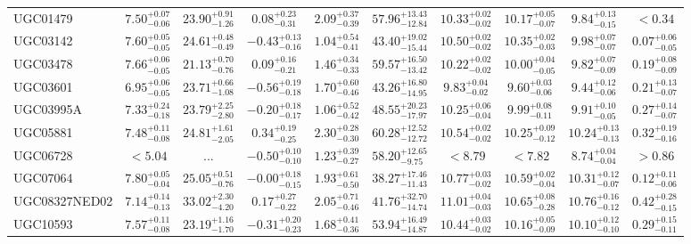 \documentclass[onecolumn]{mn2e}
\begin{document}
\begin{landscape}
{\begin{center}
\begin{longtable}{lccccccccc}
UGC01479 & $7.50_{-0.06}^{+0.07}$ & $23.90_{-1.26}^{+0.91}$ & $0.08_{-0.31}^{+0.23}$ & $2.09_{-0.39}^{+0.37}$ &$57.96_{-12.84}^{+13.43}$ & $10.33_{-0.02}^{+0.02}$ & $10.17_{-0.07}^{+0.05}$ & $9.84_{-0.15}^{+0.13}$ & $<0.34$ \\
UGC03142 & $7.60_{-0.05}^{+0.05}$ & $24.61_{-0.49}^{+0.48}$ & $-0.43_{-0.16}^{+0.13}$ & $1.04_{-0.41}^{+0.54}$ &$43.40_{-15.44}^{+19.02}$ & $10.50_{-0.02}^{+0.02}$ & $10.35_{-0.03}^{+0.02}$ & $9.98_{-0.07}^{+0.07}$ & $0.07_{-0.05}^{+0.06}$ \\
UGC03478 & $7.66_{-0.05}^{+0.06}$ & $21.13_{-0.76}^{+0.70}$ & $0.09_{-0.21}^{+0.16}$ & $1.46_{-0.33}^{+0.34}$ &$59.57_{-13.42}^{+16.50}$ & $10.22_{-0.02}^{+0.02}$ & $10.00_{-0.05}^{+0.04}$ & $9.82_{-0.09}^{+0.07}$ & $0.19_{-0.09}^{+0.08}$ \\
UGC03601 & $6.95_{-0.05}^{+0.06}$ & $23.71_{-1.08}^{+0.66}$ & $-0.56_{-0.18}^{+0.19}$ & $1.70_{-0.46}^{+0.60}$ &$43.26_{-14.95}^{+16.80}$ & $9.83_{-0.02}^{+0.04}$ & $9.60_{-0.06}^{+0.03}$ & $9.44_{-0.06}^{+0.12}$ & $0.21_{-0.07}^{+0.13}$ \\
UGC03995A & $7.33_{-0.18}^{+0.24}$ & $23.79_{-2.80}^{+2.25}$ & $-0.20_{-0.17}^{+0.18}$ & $1.06_{-0.42}^{+0.52}$ &$48.55_{-17.97}^{+20.23}$ & $10.25_{-0.04}^{+0.06}$ & $9.99_{-0.11}^{+0.08}$ & $9.91_{-0.05}^{+0.10}$ & $0.27_{-0.07}^{+0.14}$ \\
UGC05881 & $7.48_{-0.08}^{+0.11}$ & $24.81_{-2.05}^{+1.61}$ & $0.34_{-0.25}^{+0.19}$ & $2.30_{-0.30}^{+0.28}$ &$60.28_{-12.72}^{+12.52}$ & $10.54_{-0.02}^{+0.02}$ & $10.25_{-0.12}^{+0.09}$ & $10.24_{-0.13}^{+0.13}$ & $0.32_{-0.16}^{+0.19}$ \\
UGC06728 & $<5.04$ & ... & $-0.50_{-0.10}^{+0.10}$ & $1.23_{-0.27}^{+0.39}$ &$58.20_{-9.75}^{+12.65}$ & $<8.79$ & $<7.82$ & $8.74_{-0.04}^{+0.04}$ & $>0.86$ \\
UGC07064 & $7.80_{-0.04}^{+0.05}$ & $25.05_{-0.76}^{+0.51}$ & $-0.00_{-0.15}^{+0.18}$ & $1.93_{-0.50}^{+0.61}$ &$38.27_{-11.43}^{+17.46}$ & $10.77_{-0.02}^{+0.03}$ & $10.59_{-0.04}^{+0.02}$ & $10.31_{-0.07}^{+0.12}$ & $0.12_{-0.06}^{+0.11}$ \\
UGC08327NED02 & $7.14_{-0.13}^{+0.14}$ & $33.02_{-4.20}^{+2.30}$ & $0.17_{-0.22}^{+0.27}$ & $2.05_{-0.46}^{+0.71}$ &$41.76_{-14.74}^{+32.70}$ & $11.01_{-0.03}^{+0.04}$ & $10.65_{-0.28}^{+0.08}$ & $10.76_{-0.12}^{+0.16}$ & $0.42_{-0.15}^{+0.28}$ \\
UGC10593 & $7.57_{-0.08}^{+0.11}$ & $23.19_{-1.70}^{+1.16}$ & $-0.31_{-0.23}^{+0.20}$ & $1.68_{-0.36}^{+0.41}$ &$53.94_{-14.87}^{+16.49}$ & $10.44_{-0.02}^{+0.03}$ & $10.16_{-0.09}^{+0.05}$ & $10.10_{-0.10}^{+0.12}$ & $0.29_{-0.11}^{+0.15}$ \\

\end{longtable}
\end{center}}
\end{landscape}
\end{document}
